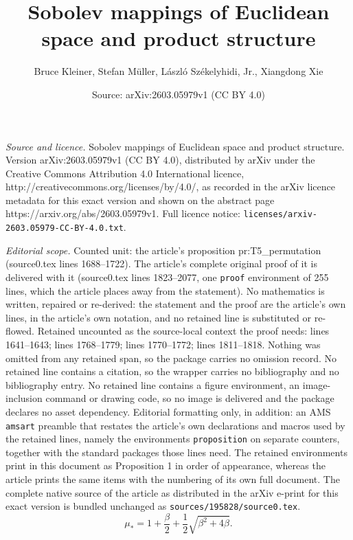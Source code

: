 \documentclass[10pt,a4paper]{amsart}
\title{Sobolev mappings of Euclidean space and product structure}
\author{Bruce Kleiner, Stefan M\"uller, L\'{a}szl\'{o} Sz{\'{e}}kelyhidi, Jr., Xiangdong Xie}
\date{Source: arXiv:2603.05979v1 (CC BY 4.0)}
\begin{document}
\maketitle

\noindent\emph{Source and licence.} Sobolev mappings of Euclidean space and product structure. Version arXiv:2603.05979v1 (CC BY 4.0), distributed by arXiv under the Creative Commons Attribution 4.0 International licence, http://creativecommons.org/licenses/by/4.0/, as recorded in the arXiv licence metadata for this exact version and shown on the abstract page https://arxiv.org/abs/2603.05979v1. Full licence notice: \texttt{licenses/arxiv-2603.05979-CC-BY-4.0.txt}.\par\smallskip

\noindent\textit{Editorial scope.} Counted unit: the article's proposition pr:T5\_permutation (source0.tex lines 1688--1722). The article's complete original proof of it is delivered with it (source0.tex lines 1823--2077, one \texttt{proof} environment of 255 lines, which the article places away from the statement). No mathematics is written, repaired or re-derived: the statement and the proof are the article's own lines, in the article's own notation, and no retained line is substituted or re-flowed.  Retained uncounted as the source-local context the proof needs: lines 1641--1643; lines 1768--1779; lines 1770--1772; lines 1811--1818.  Nothing was omitted from any retained span, so the package carries no omission record.  No retained line contains a citation, so the wrapper carries no bibliography and no bibliography entry.  No retained line contains a figure environment, an image-inclusion command or drawing code, so no image is delivered and the package declares no asset dependency.  Editorial formatting only, in addition: an AMS \texttt{amsart} preamble that restates the article's own declarations and macros used by the retained lines, namely the environments \texttt{proposition} on separate counters, together with the standard packages those lines need.  The retained environments print in this document as Proposition 1 in order of appearance, whereas the article prints the same items with the numbering of its own full document.  The complete native source of the article as distributed in the arXiv e-print for this exact version is bundled unchanged as \texttt{sources/195828/source0.tex}.
\begin{equation}\label{T5e:mu*}
\mu_*=1+\frac{\beta}{2}+\frac{1}{2}\sqrt{\beta^2+4\beta}.
\end{equation}
\end{document}
